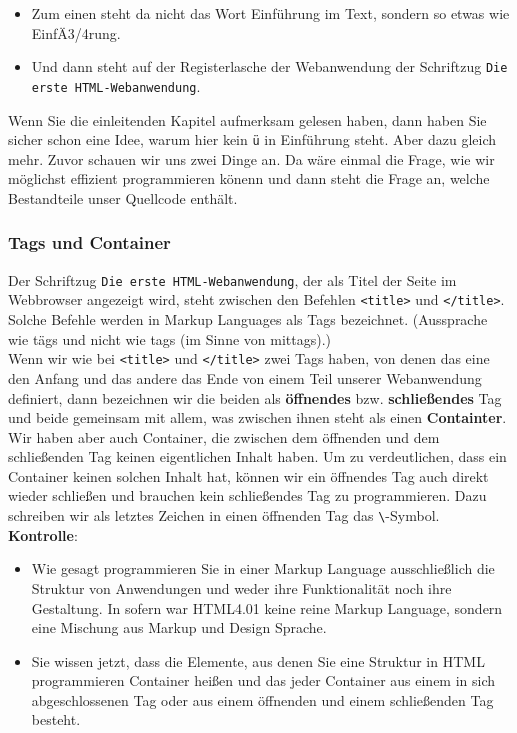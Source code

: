 \begin{itemize}
	\item Zum einen steht da nicht das Wort Einführung im Text, sondern so etwas wie EinfÄ3/4rung.
	\item Und dann steht auf der Registerlasche der Webanwendung der Schriftzug \verb|Die erste HTML-Webanwendung|.
\end{itemize}

Wenn Sie die einleitenden Kapitel aufmerksam gelesen haben, dann haben Sie sicher schon eine Idee, warum hier kein \verb|ü| in Einführung steht. Aber dazu gleich mehr. Zuvor schauen wir uns zwei Dinge an. Da wäre einmal die Frage, wie wir möglichst effizient programmieren könenn und dann steht die Frage an, welche Bestandteile unser Quellcode enthält.

\subsubsection{Tags und Container}

Der Schriftzug \verb|Die erste HTML-Webanwendung|, der als Titel der Seite im Webbrowser angezeigt wird, steht zwischen den \glqq{}Befehlen\grqq{} \verb|<title>| und \verb|</title>|. Solche \glqq{}Befehle\grqq{} werden in Markup Languages als Tags bezeichnet. (Aussprache wie tägs und nicht wie tags (im Sinne von mittags).)\\

Wenn wir wie bei \verb|<title>| und \verb|</title>| zwei Tags haben, von denen das eine den Anfang und das andere das Ende von einem Teil unserer Webanwendung definiert, dann bezeichnen wir die beiden als \textbf{öffnendes} bzw. \textbf{schließendes} Tag und beide gemeinsam mit allem, was zwischen ihnen steht als einen \textbf{Containter}.\\

Wir haben aber auch Container, die zwischen dem öffnenden und dem schließenden Tag keinen eigentlichen Inhalt haben. Um zu verdeutlichen, dass ein Container keinen solchen Inhalt hat, können wir ein öffnendes Tag auch direkt wieder schließen und brauchen kein schließendes Tag zu programmieren. Dazu schreiben wir als letztes Zeichen in einen öffnenden Tag das \verb|\|-Symbol.\\

\textbf{Kontrolle}:

\begin{itemize}
	\item Wie gesagt programmieren Sie in einer Markup Language ausschließlich die Struktur von Anwendungen und weder ihre Funktionalität noch ihre Gestaltung. In sofern war HTML4.01 keine reine Markup Language, sondern eine Mischung aus Markup und Design Sprache.
	\item Sie wissen jetzt, dass die Elemente, aus denen Sie eine Struktur in HTML programmieren Container heißen und das jeder Container aus einem in sich abgeschlossenen Tag oder aus einem öffnenden und einem schließenden Tag besteht.
\end{itemize}

